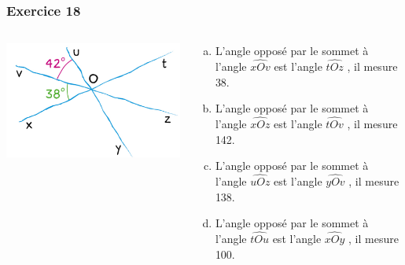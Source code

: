 \documentclass[xcolor={dvipsnames}]{beamer}
\begin{document}
\begin{frame}
	\frametitle{Exercice 18}
	
	\begin{columns}
		\begin{column}{0.4\textwidth}
			\begin{center}
				\includegraphics[scale=0.5]{18}\pause
			\end{center}
		\end{column}
		\begin{column}{0.6\textwidth}
			\begin{enumerate}[a.]
				\item L'angle opposé par le sommet à l'angle $\widehat{xOv}$ est l'angle $\widehat{tOz}$ \pause , il mesure 38\degree. \pause
				\item L'angle opposé par le sommet à l'angle $\widehat{xOz}$ est l'angle $\widehat{tOv}$ \pause , il mesure 142\degree. \pause
				\item L'angle opposé par le sommet à l'angle $\widehat{uOz}$ est l'angle $\widehat{yOv}$ \pause , il mesure 138\degree. \pause\\
				\item L'angle opposé par le sommet à l'angle $\widehat{tOu}$ est l'angle $\widehat{xOy}$ \pause , il mesure 100\degree. \pause
			\end{enumerate}
		\end{column}
	\end{columns}
	
	
	
\end{frame}
\end{document}
